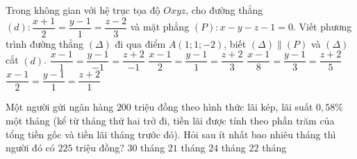 \begin{ex}%
	Trong không gian với hệ trục tọa độ $Oxyz$, cho đường thẳng $(d): \dfrac{x+1}{2}=\dfrac{y-1}{1}=\dfrac{z-2}{3}$ và mặt phẳng $(P): x-y-z-1=0$. Viết phương trình đường thẳng $(\Delta )$ đi qua điểm $A(1;1;-2)$, biết $(\Delta ) \parallel (P)$ và $(\Delta )$ cắt $(d)$.
	\choice
	{$\dfrac{x-1}{1}=\dfrac{y-1}{-1}=\dfrac{z+2}{-1}$}
	{$\dfrac{x-1}{2}=\dfrac{y-1}{1}=\dfrac{z+2}{3} $}
	{\True $ \dfrac{x-1}{8}=\dfrac{y-1}{3}=\dfrac{z+2}{5}$}
	{$\dfrac{x-1}{2}=\dfrac{y-1}{1}=\dfrac{z+2}{1}$}
\end{ex}
\begin{ex}%
	Một người gửi ngân hàng $200$ triệu đồng theo hình thức lãi kép, lãi suất $0{,}58 \%$ một tháng (kể từ tháng thứ hai trở đi, tiền lãi được tính theo phần trăm của tổng tiền gốc và tiền lãi tháng trước đó). Hỏi sau ít nhất bao nhiêu tháng thì người đó có $225$ triệu đồng?
	\choice
	{$30$ tháng}
	{\True $21$ tháng}
	{$24$ tháng}
	{$22$ tháng}
\end{ex}
